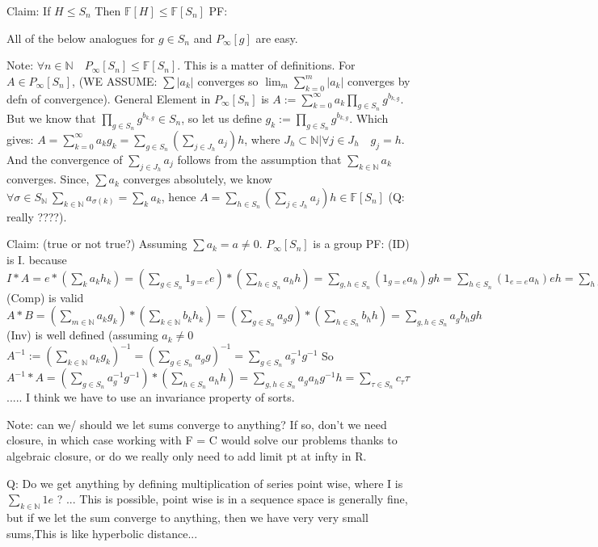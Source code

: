 \documentclass{article}
\theoremstyle{definition}
\begin{document}
Claim: If $ H \leq S_n $ Then  $ \mathbb{F}[H] \leq  \mathbb{F}[S_n]  $
PF:

All of the below analogues for $g\in S_n$ and  $P_\infty[g]$ are easy.

Note: $\forall n \in \mathbb{N} \quad  P_\infty[S_n] \leq \mathbb{F}[S_n]  $. This is a matter of definitions. For $ A \in P_\infty[S_n]$,  (WE ASSUME: $\sum |a_k|$ converges  so $\lim_m \sum_{k=0}^m |a_k| $ converges by defn of convergence). General Element in $P_\infty[S_n] $ is $A := \sum_{k=0}^\infty a_k \prod_{g \in S_n}  g^{b_{k,g}} $. But we know that $\prod_{g \in S_n}  g^{b_{k,g} }\in S_n $, so let us define $g_k := \prod_{g \in S_n}  g^{b_{k,g} } $. Which gives: $A = \sum_{k =0}^\infty a_k g_k = \sum_{g \in S_n} (\sum_{j \in J_h} a_j) h$, where $ J_h \subset \mathbb{N} | \forall j \in J_h \quad g_j = h $. And the convergence of $\sum_{j \in J_h} a_j $ follows from the assumption that $\sum_{k \in \mathbb{N}} a_k$ converges. Since, $\sum a_k $ converges absolutely, we know $\forall \sigma \in S_\mathbb{N} \: \sum_{k \in \mathbb{N} } a_{\sigma(k) } = \sum_{k} a_{k} $, hence $ 
A = \sum_{h \in S_n} (\sum_{j \in J_h} a_j)h \in \mathbb{F}[S_n]  $ (Q: really ????).

Claim: (true or not true?) Assuming $\sum a_k = a \neq 0$. $P_\infty[S_n]$ is a group
PF:
(ID) is I. because
$ I *A  =  e*(\sum_{k} a_k h_k) = (\sum_{g \in S_n} 1_{g=e}e)*(\sum_{h \in S_n} a_h h) = \sum_{g,h \in S_n} (1_{g=e}a_h)gh = \sum_{h \in S_n} (1_{e=e}a_h)eh = \sum_{h \in S_n }a_h h = A$
(Comp) is valid
$A * B = (\sum_{m\in \mathbb{N}} a_k g_k) * (\sum_{k \in \mathbb{N}} b_k h_k) = (\sum_{g\in S_n} a_g g ) * (\sum_{h \in S_n } b_h h) = \sum_{g,h \in S_n} a_g b_h gh $
(Inv) is well defined (assuming $a_k \neq 0$
$ A^{-1} := (\sum_{k \in \mathbb{N}} a_k g_k)^{-1} = (\sum_{g\in S_n} a_g g)^{-1} = \sum_{g\in S_n} a_g^{-1} g^{-1}$
So  $ A^{-1} * A = (\sum_{g \in S_n} a_g^{-1} g^{-1}) * (\sum_{h \in S_n} a_h h) = \sum_{g,h \in S_n} a_g a_h g^{-1} h = \sum_{\tau \in S_n} c_\tau \tau$ 
..... I think we have to use an invariance property of sorts. 

Note: can we/ should we let sums converge to anything? If so, don't we need closure, in which case working with F = C would solve our problems thanks to algebraic closure, or do we really only need to add limit pt at infty in R.

Q: Do we get anything by defining multiplication of series point wise, where I is $\sum_{k\in \mathbb{N}} 1 e$ ? ... This is possible, point wise is in a sequence space is generally fine, but if we let the sum converge to anything, then we have very very small sums,This is like hyperbolic distance...
\end{document}
